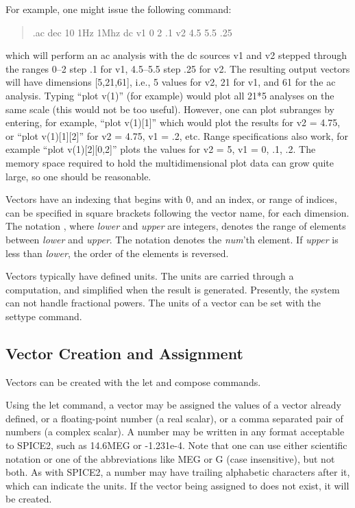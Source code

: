 For example, one might issue the following command:
\begin{quote}
{\vt .ac dec 10 1Hz 1Mhz dc v1 0 2 .1 v2 4.5 5.5 .25}
\end{quote}
which will perform an ac analysis with the dc sources {\vt v1} and
{\vt v2} stepped through the ranges 0--2 step .1 for {\vt v1},
4.5--5.5 step .25 for {\vt v2}.  The resulting output vectors will
have dimensions [5,21,61], i.e., 5 values for {\vt v2}, 21 for {\vt
v1}, and 61 for the ac analysis.  Typing ``{\vt plot v(1)}'' (for
example) would plot all 21*5 analyses on the same scale (this would
not be too useful).  However, one can plot subranges by entering, for
example, ``{\vt plot v(1)[1]}'' which would plot the results for {\vt
v2} = 4.75, or ``{\vt plot v(1)[1][2]}'' for {\vt v2} = 4.75, {\vt v1}
= .2, etc.  Range specifications also work, for example ``{\vt plot
v(1)[2][0,2]}'' plots the values for {\vt v2} = 5, {\vt v1} = 0, .1,
.2.  The memory space required to hold the multidimensional plot data
can grow quite large, so one should be reasonable.

Vectors have an indexing that begins with 0, and an index, or range of
indices, can be specified in square brackets following the vector
name, for each dimension.  The notation {}, where {\it lower} and {\it upper} are integers, denotes
the range of elements between {\it lower} and {\it upper}.  The
notation {\vt [{\it num\/}]} denotes the {\it num\/}'th element.  If
{\it upper} is less than {\it lower}, the order of the elements is
reversed.

Vectors typically have defined units.  The units are carried through a
computation, and simplified when the result is generated.  Presently,
the system can not handle fractional powers.  The units of a vector
can be set with the {\cb settype} command.

\subsection{Vector Creation and Assignment}

Vectors can be created with the {\cb let} and {\cb compose} commands. 

Using the {\cb let} command, a vector may be assigned the values of a
vector already defined, or a floating-point number (a real scalar), or
a comma separated pair of numbers (a complex scalar).  A number may be
written in any format acceptable to SPICE2, such as {\vt 14.6MEG} or
{\vt -1.231e-4}.  Note that one can use either scientific notation or
one of the abbreviations like MEG or G (case insensitive), but not
both.  As with SPICE2, a number may have trailing alphabetic
characters after it, which can indicate the units.  If the vector
being assigned to does not exist, it will be created.

